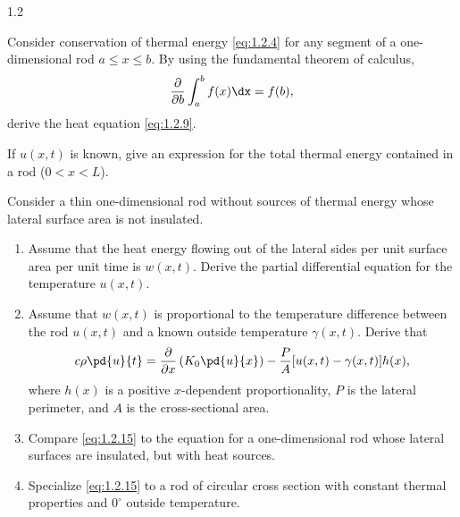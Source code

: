 \begin{exercises}{1.2}
\item Consider conservation of thermal energy \eqref{eq:1.2.4} for any segment of a one-dimensional rod $a \le x \le b$. By using the fundamental theorem of calculus,
\[
\frac{\partial}{\partial b}\int_a^b f(x)\dx = f(b),
\]
derive the heat equation \eqref{eq:1.2.9}.

\item[\starred 1.2.8.] If $u(x,t)$ is known, give an expression for the total thermal energy contained in a rod ($0 < x < L$).

\item Consider a thin one-dimensional rod without sources of thermal energy whose lateral surface area is not insulated.
\begin{enumerate}
\item[(a)] Assume that the heat energy flowing out of the lateral sides per unit surface area per unit time is $w(x,t)$. Derive the partial differential equation for the temperature $u(x,t)$.
\item[(b)] Assume that $w(x,t)$ is proportional to the temperature difference between the rod $u(x,t)$ and a known outside temperature $\gamma(x,t)$. Derive that
\begin{equation}
c\rho\pd{u}{t} = \frac{\partial}{\partial x}\left(K_0\pd{u}{x}\right) - \frac{P}{A}[u(x,t) - \gamma(x,t)]h(x),
\label{eq:1.2.15}
\end{equation}
where $h(x)$ is a positive $x$-dependent proportionality, $P$ is the lateral perimeter, and $A$ is the cross-sectional area.
\item[(c)] Compare \eqref{eq:1.2.15} to the equation for a one-dimensional rod whose lateral surfaces are insulated, but with heat sources.
\item[(d)] Specialize \eqref{eq:1.2.15} to a rod of circular cross section with constant thermal properties and $0^\circ$ outside temperature.
\end{enumerate}

\end{exercises}
